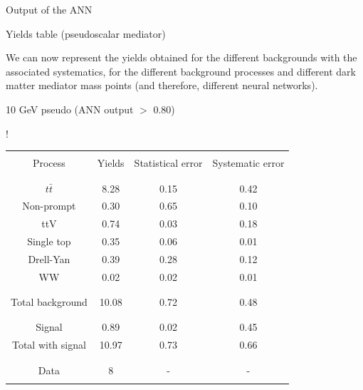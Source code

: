 \documentclass[8 pt]{beamer}
\begin{document}
\begin{frame}{Output of the ANN}
\begin{minipage}[c]{.48\linewidth}
{	}
   \end{minipage} \hfill \vfill

\end{frame}


\begin{frame}{Yields table (pseudoscalar mediator)}

	\justifying 
	We can now represent the yields obtained for the different backgrounds with the associated systematics, for the different background processes and different dark matter mediator mass points (and therefore, different neural networks). \vfill
	
	\begin{minipage}[c]{.48\linewidth}
	
	\begin{center}
	
	\begin{exampleblock}{}{ \begin{center} 10 GeV pseudo (ANN output $>$ 0.80) \end{center}} \end{exampleblock} \vspace{8pt}
	
	\resizebox{170pt} {!}{
	\begin{tabular}{c|c|c|c}
	 	& & & \\
		Process & Yields & Statistical error & Systematic error \\
		& & & \\
		\hline \hline
		& & & \\
		$t \bar t$ & 8.28 & 0.15 & 0.42 \\
		Non-prompt & 0.30 & 0.65 & 0.10 \\
		ttV & 0.74 & 0.03 & 0.18 \\
		Single top & 0.35 & 0.06 & 0.01 \\
		Drell-Yan & 0.39 & 0.28 & 0.12 \\
		WW & 0.02 & 0.02 & 0.01 \\
		& & & \\
		\hline
		& & & \\
		Total background & 10.08 & 0.72 & 0.48 \\
		& & & \\
		\hline
		& & & \\
		Signal & 0.89 & 0.02 & 0.45 \\
		Total with signal & 10.97 & 0.73 & 0.66 \\
		& & & \\
		\hline
		& & & \\
		Data & 8 & - & - \\
		& & & \\
	\end{tabular}
	} 
	

\end{center}
\end{minipage}
\end{frame}
\end{document}
